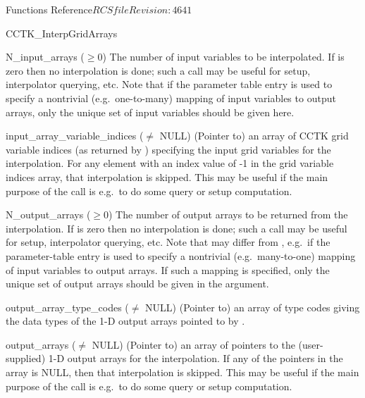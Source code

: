 \begin{cactuspart}{ Functions Reference}{$RCSfile$}{$Revision: 4641 $}
\begin{FunctionDescription}{CCTK\_InterpGridArrays}
\begin{ParameterSection}
\begin{Parameter}{N\_input\_arrays ($\ge 0$)}
The number of input variables to be interpolated.
If  is zero then no interpolation is done; such a call
may be useful for setup, interpolator querying, etc.
Note that if the parameter table entry  is used to specify
a nontrivial (e.g.\ one-to-many) mapping of input variables to output arrays,
only the
unique set of input variables should be given here.
\end{Parameter}
\begin{Parameter}{input\_array\_variable\_indices ($\ne$ NULL)}
(Pointer to) an array of  CCTK grid variable indices (as
returned by ) specifying the input grid variables for the
interpolation. For any element with an index value of -1 in the grid variable
indices array, that interpolation is skipped. This may be useful if the main
purpose of the call is e.g.\ to do some query or setup computation.
\end{Parameter}
\begin{Parameter}{N\_output\_arrays ($\ge 0$)}
The number of output arrays to be returned from the interpolation.
If  is zero then no interpolation is done; such a call
may be useful for setup, interpolator querying, etc.
Note that  may differ from , e.g.\
if the  parameter-table entry is used to specify a
nontrivial (e.g.\ many-to-one) mapping of input variables to output arrays.
If such a mapping is specified, only the unique set of output arrays
should be given in the \code{output\_arrays} argument.
\end{Parameter}
\begin{Parameter}{output\_array\_type\_codes ($\ne$ NULL)}
(Pointer to) an array of  
type codes giving the data types of the 1-D output arrays pointed to by
\code{output\_arrays[]}.
\end{Parameter}
\begin{Parameter}{output\_arrays ($\ne$ NULL)}
(Pointer to) an array of  pointers to the
(user-supplied) 1-D output arrays for the interpolation.
If any of the pointers in the  array is NULL, then that
interpolation is skipped. This may be useful if the main purpose of the call
is e.g.\ to do some query or setup computation.
\end{Parameter}
\end{ParameterSection}


\end{FunctionDescription}
\end{cactuspart}
